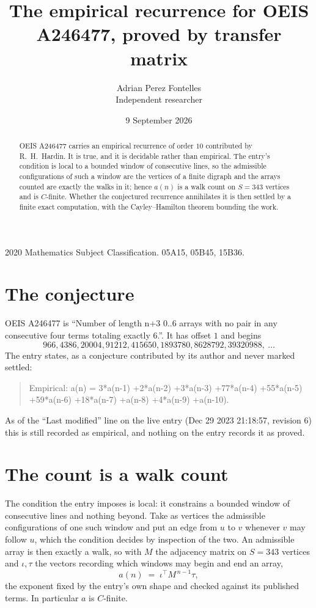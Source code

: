 \documentclass[11pt,a4paper]{article}
\title{The empirical recurrence for OEIS A246477, proved by transfer matrix}
\author{Adrian Perez Fontelles\\ \small Independent researcher}
\date{9 September 2026}
\theoremstyle{plain}
\theoremstyle{definition}
\begin{document}
\maketitle

\begin{abstract}
OEIS A246477 carries an empirical recurrence of order $10$ contributed by R.~H.~Hardin. It is
true, and it is decidable rather than empirical. The entry's condition is local to a bounded window of consecutive lines, so
the admissible configurations of such a window are the vertices of a finite digraph and the
arrays counted are exactly the walks in it; hence $a(n)$ is a walk count on $S=343$ vertices
and is $C$-finite. Whether the conjectured recurrence annihilates it is then settled by a
finite exact computation, with the Cayley--Hamilton theorem bounding the work.
\end{abstract}

\noindent\small 2020 Mathematics Subject Classification. 05A15, 05B45, 15B36.\normalsize

\section{The conjecture}

OEIS A246477 is ``Number of length n+3 0..6 arrays with no pair in any consecutive four terms totaling exactly 6.''. It has offset $1$ and begins
\[
966, 4386, 20004, 91212, 415650, 1893780, 8628792, 39320988,\ \dots
\]
The entry states, as a conjecture contributed by its author and never marked settled:
\begin{quote}
Empirical: a(n) = 3*a(n-1) +2*a(n-2) +3*a(n-3) +77*a(n-4) +55*a(n-5) +59*a(n-6) +18*a(n-7) +a(n-8) +4*a(n-9) +a(n-10).
\end{quote}
As of the ``Last modified'' line on the live entry (Dec 29 2023 21:18:57, revision 6) this is still
recorded as empirical, and nothing on the entry records it as proved.

\section{The count is a walk count}

The condition the entry imposes is local: it constrains a bounded window of consecutive lines and nothing beyond. Take as
vertices the admissible configurations of one such window and put an edge from $u$ to $v$
whenever $v$ may follow $u$, which the condition decides by inspection of the two. An
admissible array is then exactly a walk, so with $M$ the adjacency matrix on $S=343$ vertices
and $\iota,\tau$ the vectors recording which windows may begin and end an array,
\[
a(n)\;=\;\iota^{\!\top}M^{\,n-1}\tau ,
\]
the exponent fixed by the entry's own shape and checked against its published terms. In
particular $a$ is $C$-finite.
\end{document}

